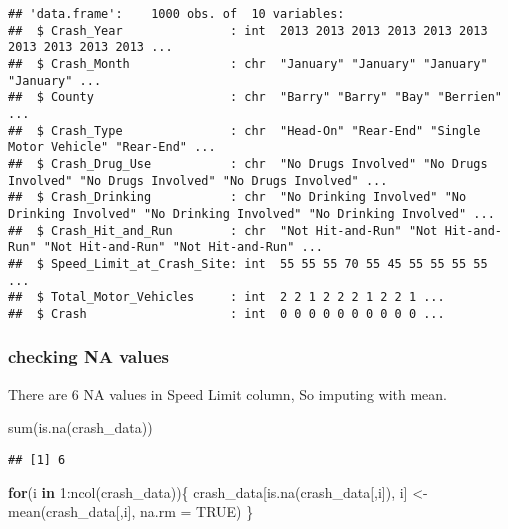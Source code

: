 \documentclass[
]{article}
\newenvironment{Shaded}{\begin{snugshade}}{\end{snugshade}}
\newcommand{\AttributeTok}[1]{\textcolor[rgb]{0.77,0.63,0.00}{#1}}
\newcommand{\ConstantTok}[1]{\textcolor[rgb]{0.00,0.00,0.00}{#1}}
\newcommand{\ControlFlowTok}[1]{\textcolor[rgb]{0.13,0.29,0.53}{\textbf{#1}}}
\newcommand{\DecValTok}[1]{\textcolor[rgb]{0.00,0.00,0.81}{#1}}
\newcommand{\FunctionTok}[1]{\textcolor[rgb]{0.00,0.00,0.00}{#1}}
\newcommand{\NormalTok}[1]{#1}
\newcommand{\OtherTok}[1]{\textcolor[rgb]{0.56,0.35,0.01}{#1}}
\newcommand{\SpecialCharTok}[1]{\textcolor[rgb]{0.00,0.00,0.00}{#1}}
\begin{document}
\begin{verbatim}
## 'data.frame':    1000 obs. of  10 variables:
##  $ Crash_Year               : int  2013 2013 2013 2013 2013 2013 2013 2013 2013 2013 ...
##  $ Crash_Month              : chr  "January" "January" "January" "January" ...
##  $ County                   : chr  "Barry" "Barry" "Bay" "Berrien" ...
##  $ Crash_Type               : chr  "Head-On" "Rear-End" "Single Motor Vehicle" "Rear-End" ...
##  $ Crash_Drug_Use           : chr  "No Drugs Involved" "No Drugs Involved" "No Drugs Involved" "No Drugs Involved" ...
##  $ Crash_Drinking           : chr  "No Drinking Involved" "No Drinking Involved" "No Drinking Involved" "No Drinking Involved" ...
##  $ Crash_Hit_and_Run        : chr  "Not Hit-and-Run" "Not Hit-and-Run" "Not Hit-and-Run" "Not Hit-and-Run" ...
##  $ Speed_Limit_at_Crash_Site: int  55 55 55 70 55 45 55 55 55 55 ...
##  $ Total_Motor_Vehicles     : int  2 2 1 2 2 2 1 2 2 1 ...
##  $ Crash                    : int  0 0 0 0 0 0 0 0 0 0 ...
\end{verbatim}

\hypertarget{checking-na-values}{%
\subsubsection{checking NA values}\label{checking-na-values}}

There are 6 NA values in Speed Limit column, So imputing with mean.

\begin{Shaded}
\begin{Highlighting}[]
\FunctionTok{sum}\NormalTok{(}\FunctionTok{is.na}\NormalTok{(crash\_data))}
\end{Highlighting}
\end{Shaded}

\begin{verbatim}
## [1] 6
\end{verbatim}

\begin{Shaded}
\begin{Highlighting}[]
\ControlFlowTok{for}\NormalTok{(i }\ControlFlowTok{in} \DecValTok{1}\SpecialCharTok{:}\FunctionTok{ncol}\NormalTok{(crash\_data))\{}
\NormalTok{  crash\_data[}\FunctionTok{is.na}\NormalTok{(crash\_data[,i]), i] }\OtherTok{\textless{}{-}} \FunctionTok{mean}\NormalTok{(crash\_data[,i], }\AttributeTok{na.rm =} \ConstantTok{TRUE}\NormalTok{)}
\NormalTok{\}}
\end{Highlighting}
\end{Shaded}
\end{document}
